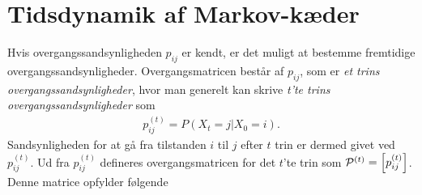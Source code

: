 \begin{bev}

\end{bev}


\section{Tidsdynamik af Markov-kæder}
Hvis overgangssandsynligheden $p_{ij}$ er kendt, er det muligt at bestemme fremtidige overgangssandsynligheder. Overgangsmatricen består af $p_{ij}$, som er \textit{et trins overgangssandsynligheder}, hvor man generelt kan skrive \textit{t'te trins overgangssandsynligheder} som 
\begin{align}\label{eq:nte-trinsovergangssandsynligheden}
    p_{ij}^{(t)} = P ( X_t = j | X_0 = i).
\end{align}
Sandsynligheden for at gå fra tilstanden $i$ til $j$ efter $t$ trin er dermed givet ved $p_{ij}^{(t)}$. Ud fra $p_{ij}^{(t)}$ defineres overgangsmatricen for det $t$'te trin som $\P^{(t)}=\left[p_{ij}^{(t)}\right]$. Denne matrice opfylder følgende

